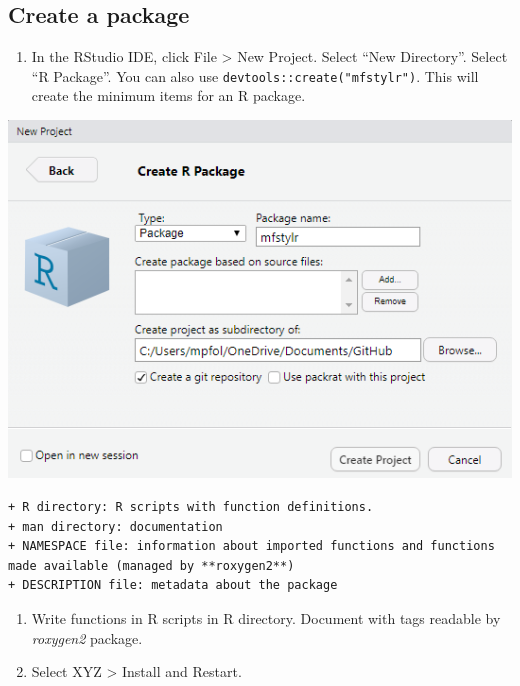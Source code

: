 \documentclass[
]{book}
\providecommand{\tightlist}{%
  \setlength{\itemsep}{0pt}\setlength{\parskip}{0pt}}
\begin{document}
\hypertarget{create-a-package}{%
\subsection*{Create a package}\label{create-a-package}}

\begin{enumerate}
\def\labelenumi{\arabic{enumi}.}
\tightlist
\item
  In the RStudio IDE, click File \textgreater{} New Project. Select ``New Directory''. Select ``R Package''. You can also use \texttt{devtools::create("mfstylr")}. This will create the minimum items for an R package.
\end{enumerate}

\includegraphics{./images/create_pkg.png}

\begin{verbatim}
+ R directory: R scripts with function definitions.
+ man directory: documentation
+ NAMESPACE file: information about imported functions and functions made available (managed by **roxygen2**)
+ DESCRIPTION file: metadata about the package
\end{verbatim}

\begin{enumerate}
\def\labelenumi{\arabic{enumi}.}
\setcounter{enumi}{1}
\item
  Write functions in R scripts in R directory. Document with tags readable by \emph{roxygen2} package.
\item
  Select XYZ \textgreater{} Install and Restart.
\end{enumerate}
\end{document}
